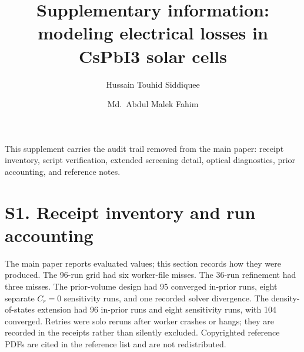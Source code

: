 \documentclass[11pt,a4paper]{article}
\title{Supplementary information: modeling electrical losses in CsPbI3 solar cells}
\author{Hussain Touhid Siddiquee \and Md.\ Abdul Malek Fahim}
\date{}
\begin{document}
\maketitle

This supplement carries the audit trail removed from the main paper: receipt inventory, script verification, extended screening detail, optical diagnostics, prior accounting, and reference notes.

\section*{S1. Receipt inventory and run accounting}

The main paper reports evaluated values; this section records how they were produced. The 96-run grid had six worker-file misses. The 36-run refinement had three misses. The prior-volume design had 95 converged in-prior runs, eight separate $C_r=0$ sensitivity runs, and one recorded solver divergence. The density-of-states extension had 96 in-prior runs and eight sensitivity runs, with 104 converged. Retries were solo reruns after worker crashes or hangs; they are recorded in the receipts rather than silently excluded. Copyrighted reference PDFs are cited in the reference list and are not redistributed.
\end{document}
